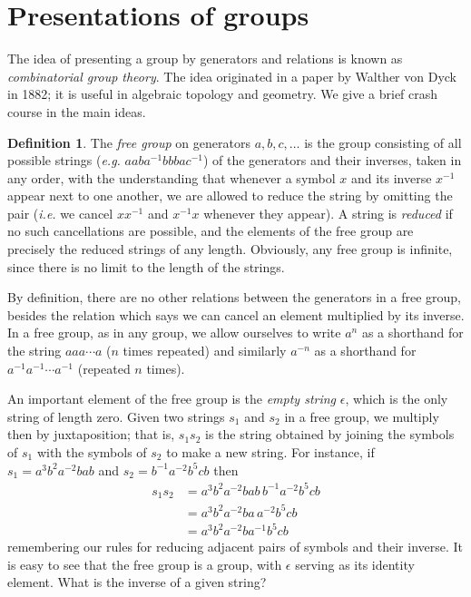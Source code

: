 \documentclass[11pt,oneside]{article}
\theoremstyle{definition}
\newtheorem{defn}[thm]{Definition}
\begin{document}
\setcounter{section}{30}

\section{Presentations of groups}\noindent
The idea of presenting a group by generators and relations is known as
\emph{combinatorial group theory}. The idea originated in a paper by
Walther von Dyck in 1882; it is useful in algebraic topology and
geometry. We give a brief crash course in the main ideas.

\begin{defn}
  The \emph{free group} on generators $a,b,c, \dots$ is the group
  consisting of all possible strings ({\em e.g.}
  $aaba^{-1}bbbac^{-1}$) of the generators and their inverses, taken
  in any order, with the understanding that whenever a symbol $x$ and
  its inverse $x^{-1}$ appear next to one another, we are allowed to
  reduce the string by omitting the pair ({\em i.e.} we cancel
  $xx^{-1}$ and $x^{-1}x$ whenever they appear).  A string is {\em
    reduced} if no such cancellations are possible, and the elements
  of the free group are precisely the reduced strings of any
  length. Obviously, any free group is infinite, since there is no
  limit to the length of the strings.
\end{defn}

By definition, there are no other relations between the generators in
a free group, besides the relation which says we can cancel an element
multiplied by its inverse. In a free group, as in any group, we allow
ourselves to write $a^n$ as a shorthand for the string $aaa\cdots a$
($n$ times repeated) and similarly $a^{-n}$ as a shorthand for
$a^{-1}a^{-1}\cdots a^{-1}$ (repeated $n$ times). 

An important element of the free group is the {\em empty string}
$\epsilon$, which is the only string of length zero. Given two strings
$s_1$ and $s_2$ in a free group, we multiply then by juxtaposition;
that is, $s_1s_2$ is the string obtained by joining the symbols of
$s_1$ with the symbols of $s_2$ to make a new string. For instance,
if $s_1 = a^3b^2a^{-2}bab$ and $s_2 = b^{-1}a^{-2}b^5cb$ then
\begin{align*}
  s_1s_2 &= a^3b^2a^{-2}bab\, b^{-1}a^{-2}b^5cb \\
  &= a^3b^2a^{-2}ba \, a^{-2}b^5cb \\
  &= a^3b^2a^{-2}b a^{-1}b^5cb 
\end{align*}
remembering our rules for reducing adjacent pairs of symbols and their
inverse. It is easy to see that the free group is a group, with
$\epsilon$ serving as its identity element. What is the inverse of a
given string?
\end{document}
